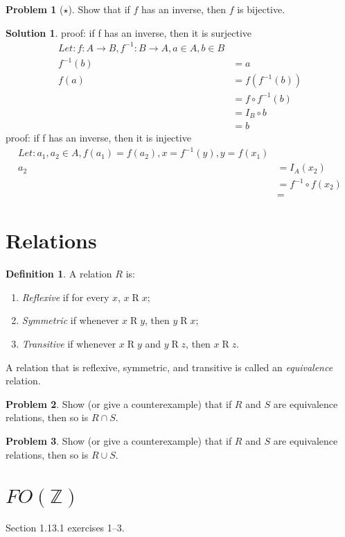 \documentclass[10pt]{article}
\theoremstyle{definition}
\newtheorem{defn}{Definition}
\newtheorem{prob}{Problem}
\newtheorem{sol}{Solution}
\begin{document}
  \begin{prob}[$\star$]
    Show that if $f$ has an inverse, then $f$ is bijective.
  \end{prob}
  
  \begin{sol}
   proof: if f has an inverse, then it is surjective
   \begin{align}
   Let:  f: A \rightarrow B, f^{-1}: B \rightarrow A, a \in A, b \in B \\
   f^{-1}(b) &= a \\
   f(a) &= f(f^{-1}(b)) \\
       &= f \circ f^{-1} (b) \\
        &= I_B \circ b \\
        &= b   
   \end{align}
   proof: if f has an inverse, then it is injective
   \begin{align}
    Let: a_1, a_2 \in A, f(a_1) = f(a_2), x = f^{-1}(y), y = f(x_1) \\
    a_2 &= I_A(x_2) \\
        &= f^{-1} \circ f (x_2) \\
        &= 
   \end{align}
  \end{sol}
  
  \section*{Relations}
  \newcommand\R{\mathrel{R}}
  
  
  \begin{defn}
    A relation $R$ is:
    \begin{enumerate}
    \item \emph{Reflexive} if for every $x$, $x \R x$;
    \item \emph{Symmetric} if whenever $x \R y$, then $y \R x$;
    \item \emph{Transitive} if whenever $x \R y$ and $y \R z$, then $x \R z$.
    \end{enumerate}
    A relation that is reflexive, symmetric, and transitive is called an \emph{equivalence} relation.
  \end{defn}
  
  \begin{prob}
    Show (or give a counterexample) that if $R$ and $S$ are equivalence relations, then so is $R \cap
    S$.
  \end{prob}
  
  
  \begin{prob}
    Show (or give a counterexample) that if $R$ and $S$ are equivalence relations, then so is
    $R \cup S$.
  \end{prob}
  
  
  \section*{$FO(\mathbb Z)$}
  
  Section 1.13.1 exercises 1--3.
  
  
  
\end{document}
